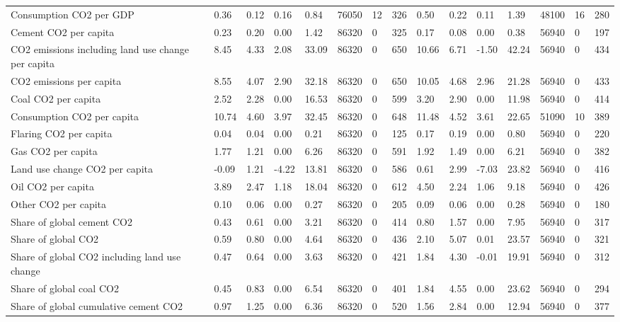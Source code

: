 \begin{longtable}{lllllllllllllll}
\addlinespace
Consumption CO2 per GDP & 0.36 & 0.12 & 0.16 & 0.84 & 76050 & 12 & 326 & 0.50 & 0.22 & 0.11 & 1.39 & 48100 & 16 & 280\\
Cement CO2 per capita & 0.23 & 0.20 & 0.00 & 1.42 & 86320 & 0 & 325 & 0.17 & 0.08 & 0.00 & 0.38 & 56940 & 0 & 197\\
CO2 emissions including land use change per capita & 8.45 & 4.33 & 2.08 & 33.09 & 86320 & 0 & 650 & 10.66 & 6.71 & -1.50 & 42.24 & 56940 & 0 & 434\\
CO2 emissions per capita & 8.55 & 4.07 & 2.90 & 32.18 & 86320 & 0 & 650 & 10.05 & 4.68 & 2.96 & 21.28 & 56940 & 0 & 433\\
Coal CO2 per capita & 2.52 & 2.28 & 0.00 & 16.53 & 86320 & 0 & 599 & 3.20 & 2.90 & 0.00 & 11.98 & 56940 & 0 & 414\\
\addlinespace
Consumption CO2 per capita & 10.74 & 4.60 & 3.97 & 32.45 & 86320 & 0 & 648 & 11.48 & 4.52 & 3.61 & 22.65 & 51090 & 10 & 389\\
Flaring CO2 per capita & 0.04 & 0.04 & 0.00 & 0.21 & 86320 & 0 & 125 & 0.17 & 0.19 & 0.00 & 0.80 & 56940 & 0 & 220\\
Gas CO2 per capita & 1.77 & 1.21 & 0.00 & 6.26 & 86320 & 0 & 591 & 1.92 & 1.49 & 0.00 & 6.21 & 56940 & 0 & 382\\
Land use change CO2 per capita & -0.09 & 1.21 & -4.22 & 13.81 & 86320 & 0 & 586 & 0.61 & 2.99 & -7.03 & 23.82 & 56940 & 0 & 416\\
Oil CO2 per capita & 3.89 & 2.47 & 1.18 & 18.04 & 86320 & 0 & 612 & 4.50 & 2.24 & 1.06 & 9.18 & 56940 & 0 & 426\\
\addlinespace
Other CO2 per capita & 0.10 & 0.06 & 0.00 & 0.27 & 86320 & 0 & 205 & 0.09 & 0.06 & 0.00 & 0.28 & 56940 & 0 & 180\\
Share of global cement CO2 & 0.43 & 0.61 & 0.00 & 3.21 & 86320 & 0 & 414 & 0.80 & 1.57 & 0.00 & 7.95 & 56940 & 0 & 317\\
Share of global CO2 & 0.59 & 0.80 & 0.00 & 4.64 & 86320 & 0 & 436 & 2.10 & 5.07 & 0.01 & 23.57 & 56940 & 0 & 321\\
Share of global CO2 including land use change & 0.47 & 0.64 & 0.00 & 3.63 & 86320 & 0 & 421 & 1.84 & 4.30 & -0.01 & 19.91 & 56940 & 0 & 312\\
Share of global coal CO2 & 0.45 & 0.83 & 0.00 & 6.54 & 86320 & 0 & 401 & 1.84 & 4.55 & 0.00 & 23.62 & 56940 & 0 & 294\\
\addlinespace
Share of global cumulative cement CO2 & 0.97 & 1.25 & 0.00 & 6.36 & 86320 & 0 & 520 & 1.56 & 2.84 & 0.00 & 12.94 & 56940 & 0 & 377\\

\end{longtable}
